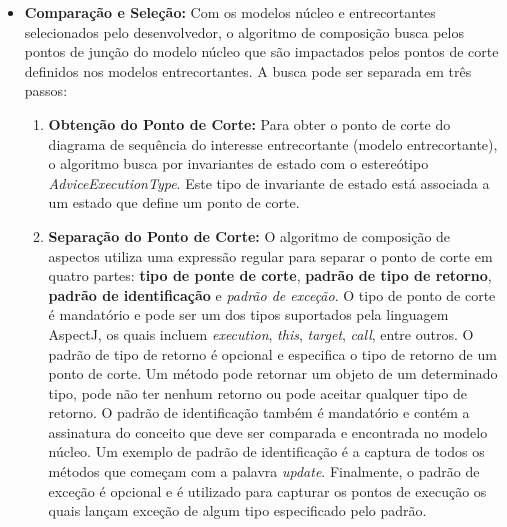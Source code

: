 	\begin{itemize}
	  
	  \item \textbf{Comparação e Seleção:} Com os modelos núcleo e entrecortantes selecionados pelo desenvolvedor, o algoritmo de composição busca pelos
	  pontos de junção do modelo núcleo que são impactados pelos pontos de corte definidos nos modelos entrecortantes. A busca pode ser separada em três
	  passos:
	  
	  \begin{enumerate}

	    \item \textbf{Obtenção do Ponto de Corte:} Para obter o ponto de corte do diagrama de sequência do interesse entrecortante (modelo
	    entrecortante), o algoritmo busca por invariantes de estado com o estereótipo \textit{AdviceExecutionType}. Este tipo de invariante de estado
	    está associada a um estado que define um ponto de corte.

	    \item \textbf{Separação do Ponto de Corte:} O algoritmo de composição de aspectos utiliza uma expressão regular para separar o ponto de corte em
	    quatro partes: \textbf{tipo de ponte de corte}, \textbf{padrão de tipo de retorno}, \textbf{padrão de identificação} e \textit{padrão de
	    exceção}. O tipo de ponto de corte é mandatório e pode ser um dos tipos suportados pela linguagem AspectJ, os quais incluem \textit{execution},
	    \textit{this}, \textit{target}, \textit{call}, entre outros. O padrão de tipo de retorno é opcional e especifica o tipo de retorno de um ponto de
	    corte. Um método pode retornar um objeto de um determinado tipo, pode não ter nenhum retorno ou pode aceitar qualquer tipo de retorno. O padrão
	    de identificação também é mandatório e contém a assinatura do conceito que deve ser comparada e encontrada no modelo núcleo. Um exemplo de padrão
	    de identificação é a captura de todos os métodos que começam com a palavra \textit{update}. Finalmente, o padrão de exceção é opcional e é
	    utilizado para capturar os pontos de execução os quais lançam exceção de algum tipo especificado pelo padrão.
	    

\end{enumerate}
\end{itemize}
